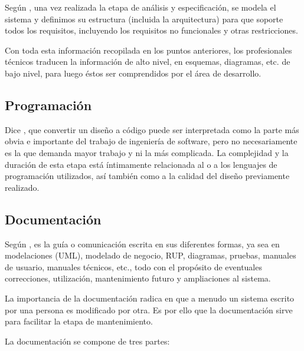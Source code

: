 \documentclass[12pt]{article}
\begin{document}
	Según \textcite{maida_metodologias_2015}, una vez realizada la etapa de análisis y especificación, se modela el sistema y definimos su estructura (incluida la arquitectura) para que soporte todos los requisitos, incluyendo los requisitos no funcionales y otras restricciones.

	Con toda esta información recopilada en los puntos anteriores, los profesionales técnicos traducen la información de alto nivel, en esquemas, diagramas, etc. de bajo nivel, para luego éstos ser
	comprendidos por el área de desarrollo.

	\subsection{Programación}

	Dice \textcite{maida_metodologias_2015}, que convertir un diseño a código puede ser interpretada como la parte más obvia e importante del trabajo de ingeniería de software, pero no necesariamente es la que demanda mayor trabajo y ni la más complicada. La complejidad y la duración de esta etapa está íntimamente relacionada al o a los lenguajes de programación utilizados, así también como a la calidad del diseño previamente realizado.

	\subsection{Documentación}

	Según \textcite{maida_metodologias_2015}, es la guía o comunicación escrita en sus diferentes formas, ya sea en modelaciones (UML), modelado de negocio, RUP, diagramas, pruebas, manuales de usuario, manuales técnicos, etc., todo con el propósito de eventuales correcciones, utilización, mantenimiento futuro y ampliaciones al sistema.

	La importancia de la documentación radica en que a menudo un sistema escrito por una persona es modificado por otra. Es por ello que la documentación sirve para facilitar la etapa de mantenimiento.

	La documentación se compone de tres partes:
\end{document}
